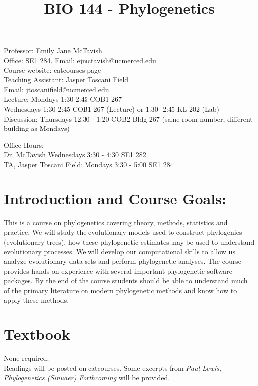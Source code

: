 \documentclass{article}
\title{BIO 144 - Phylogenetics}
\begin{document}
\maketitle
\date{}
\noindent Professor: Emily Jane McTavish\\
Office: SE1 284, Email: ejmctavish@ucmerced.edu\\
Course website: catcourses page\\

\noindent Teaching Assistant: Jasper Toscani Field\\
Email: jtoscanifield@ucmerced.edu\\

\noindent Lecture: Mondays 1:30-2:45 COB1 267\\
Wednesdays 1:30-2:45 COB1 267 (Lecture) or 1:30 -2:45 KL 202 (Lab)\\
Discussion: Thursdays 12:30 - 1:20 COB2 Bldg 267 (same room number, different building as Mondays)

\noindent Office Hours:\\
Dr. McTavish Wednesdays 3:30 - 4:30 SE1 282\\
TA, Jasper Toscani Field: Mondays 3:30 - 5:00 SE1 284





\section*{Introduction and Course Goals:}

This is a course on phylogenetics covering theory, methods, statistics and practice.
We will study the evolutionary models used to construct phylogenies (evolutionary trees), 
how these phylogenetic estimates may be used to understand evolutionary processes.
We will develop our computational skills to allow us analyze evolutionary data sets and perform phylogenetic analyses.
The course provides hands-on experience with several important phylogenetic software packages.
By the end of the course students should be able to understand much of the primary literature on modern phylogenetic methods and
know how to apply these methods.


\section*{Textbook}
None required.\\
Readings will be posted on catcourses. Some excerpts from \emph{Paul Lewis, Phylogenetics (Sinuaer) Forthcoming}
will be provided.
\end{document}

